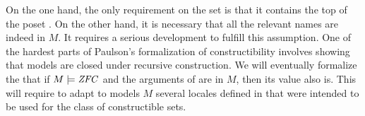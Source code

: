 On the one hand, the only requirement on the set   is that it 
contains the top  of the poset . On the other hand, it
is necessary that all the relevant names are indeed in $M$. It
requires a serious development  to fulfill this assumption. One of the
hardest parts of Paulson's formalization of constructibility involves
showing that models are closed under recursive construction. We will
eventually formalize the that if $M\models\mathit{ZFC}$ and the arguments of
 are in $M$, then its value also is. This will require
to adapt to models $M$ several locales defined in \cite{MR2507047}
that were intended to be used for the class of constructible sets.




